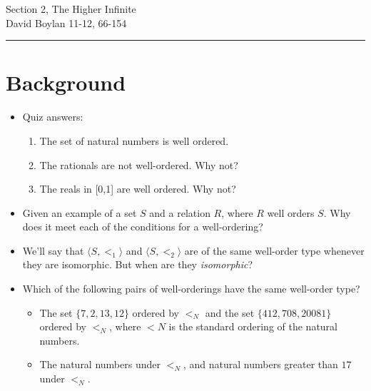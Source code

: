 \documentclass[justified]{tufte-handout}
\newcommand{\HRule}{\rule{\linewidth}{0.1mm}}
\begin{document}
\frenchspacing

\begin{fullwidth}
\noindent\Large Section 2, The Higher Infinite \large \\[.3cm]
\noindent  David Boylan \hfill{11-12, 66-154}

\noindent\HRule
\end{fullwidth}


\section{Background}

\begin{itemize}


\item Quiz answers:

\begin{enumerate}

\item The set of natural numbers is well ordered.

\item The rationals are not well-ordered. Why not?

\item The reals in [0,1] are well ordered. Why not?

\end{enumerate}

\item Given an example of a set $S$ and a relation $R$, where $R$ well orders $S$. Why does it meet each of the conditions for a well-ordering?


\item We'll say that $\langle S,<_1\rangle$ and $\langle S,<_2\rangle$ are of the same well-order type whenever they are isomorphic. But when are they \emph{isomorphic}?

  

\item Which of the following pairs of well-orderings have the same well-order type?

\begin{itemize}

 \item The set $\{7, 2, 13, 12\}$ ordered by $<_N$ and the set $\{412, 708, 20081\}$ ordered by $<_N$,
where $<N$ is the standard ordering of the natural numbers.
 
\item The natural numbers under $<_N$, and natural numbers greater than $17$ under $<_N$.


\end{itemize}

\end{itemize}
\end{document}

